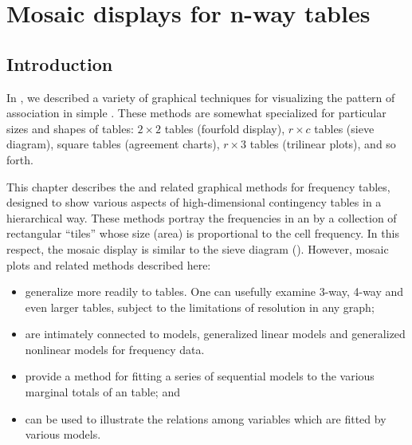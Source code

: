 \documentclass[11pt]{book}\usepackage[]{graphicx}\usepackage[]{color}
\begin{document}



\chapter{Mosaic displays for n-way tables}\label{ch:mosaic}


\section{Introduction}\label{sec:mosaic-intro}


In , we described a variety of graphical techniques
for visualizing the pattern of association in simple \ctabs.
These methods are somewhat specialized for particular
sizes and shapes of tables: 
$2 \times 2$ tables (fourfold display),
$r \times c$ tables (sieve diagram),
square tables (agreement charts), 
$r \times 3$ tables (trilinear plots), and so forth.

This chapter describes the
 and related graphical methods
for \nway frequency tables, designed to show
various aspects of high-dimensional contingency tables in a hierarchical way.
These methods portray the
frequencies in an \nway
\ctab  by a collection of rectangular ``tiles''
whose size (area) is proportional to the cell frequency.
In this respect, the mosaic display is similar to the sieve diagram ().
However, mosaic plots and related methods described here:
\begin{itemize}
\item generalize more readily to \nway tables.  One can usefully examine
3-way, 4-way and even larger tables, subject to the limitations
of resolution in any graph;
\item are intimately connected to \loglin models, generalized linear models
and generalized nonlinear models for frequency data.
\item provide a method for fitting a series of sequential \loglin
models to the various marginal totals of an \nway table; and
\item can be used to illustrate the relations among variables which
are fitted by various \loglin models.
\end{itemize}
\end{document}
